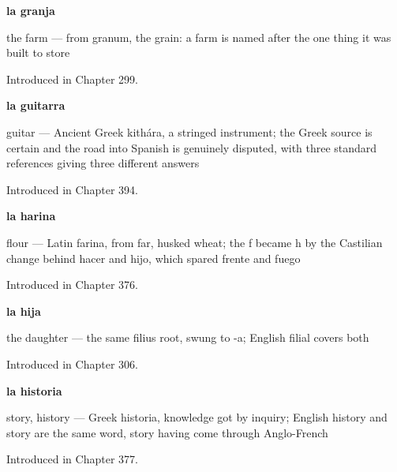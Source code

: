 \noindent\begin{minipage}[t]{\linewidth}
\raggedright
\textbf{la granja}\par
\small the farm — from granum, the grain: a farm is named after the one thing it was built to store\par
\footnotesize Introduced in Chapter 299.
\end{minipage}\par\medskip

\noindent\begin{minipage}[t]{\linewidth}
\raggedright
\textbf{la guitarra}\par
\small guitar — Ancient Greek kithára, a stringed instrument; the Greek source is certain and the road into Spanish is genuinely disputed, with three standard references giving three different answers\par
\footnotesize Introduced in Chapter 394.
\end{minipage}\par\medskip

\noindent\begin{minipage}[t]{\linewidth}
\raggedright
\textbf{la harina}\par
\small flour — Latin farina, from far, husked wheat; the f became h by the Castilian change behind hacer and hijo, which spared frente and fuego\par
\footnotesize Introduced in Chapter 376.
\end{minipage}\par\medskip

\noindent\begin{minipage}[t]{\linewidth}
\raggedright
\textbf{la hija}\par
\small the daughter --- the same filius root, swung to -a; English filial covers both\par
\footnotesize Introduced in Chapter 306.
\end{minipage}\par\medskip

\noindent\begin{minipage}[t]{\linewidth}
\raggedright
\textbf{la historia}\par
\small story, history — Greek historia, knowledge got by inquiry; English history and story are the same word, story having come through Anglo-French\par
\footnotesize Introduced in Chapter 377.
\end{minipage}\par\medskip

